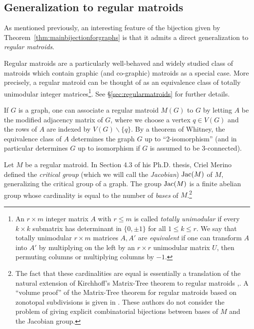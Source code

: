 \documentclass[12pt]{amsart}
\numberwithin{equation}{section}
\theoremstyle{definition}
\begin{document}
\subsection{Generalization to regular matroids} \label{sec:introregular}

As mentioned previously, an interesting feature of the bijection given by Theorem~\ref{thm:mainbijectionforgraphs} is that it admits a direct generalization to {\em regular matroids}.

Regular matroids are a particularly well-behaved and widely studied class of matroids which contain graphic (and co-graphic) matroids as a special case. More precisely, a regular matroid can be thought of as an equivalence class of totally unimodular integer matrices\footnote{An $r \times m$ integer matrix $A$ with $r \leq m$ is called {\em totally unimodular} if every $k \times k$ submatrix has determinant in $\{ 0, \pm 1 \}$ for all $1 \leq k \leq r$. We say that totally unimodular $r \times m$ matrices $A,A'$ are {\em equivalent} if one can transform $A$ into $A'$ by multiplying on the left by an $r \times r$ unimodular matrix $U$, then permuting columns or multiplying columns by $-1$.}.  See \S\ref{sec:regularmatroids} for further details.

If $G$ is a graph, one can associate a regular matroid $M(G)$ to $G$ by letting $A$ be the modified adjacency matrix of $G$, where we choose a vertex $q \in V(G)$ and the rows of $A$ are indexed by $V(G) \backslash \{ q \}$.
By a theorem of Whitney, the equivalence class of $A$ determines the graph $G$ up to ``2-isomorphism'' (and in particular determines $G$ up to isomorphism if $G$ is assumed to be $3$-connected).

Let $M$ be a regular matroid.  In Section 4.3 of his Ph.D. thesis, Criel Merino defined the {\em critical group} (which we will call the {\em Jacobian}) ${\rm Jac}(M)$ of $M$, generalizing the critical group of a graph.  The group ${\rm Jac}(M)$ is a finite abelian group whose cardinality is equal to the number of {\em bases} of $M$.\footnote{The fact that these cardinalities are equal is essentially a translation of the natural extension of Kirchhoff's Matrix-Tree theorem to regular matroids \cite{maurer1976matrix},\cite[Theorem 4.3.2]{merino1999matroids}. A ``volume proof'' of the Matrix-Tree theorem for regular matroids based on zonotopal subdivisions is given in \cite{dall2014polyhedral}.  These authors do not consider the problem of giving explicit combinatorial bijections between bases of $M$ and the Jacobian group.}
\end{document}
